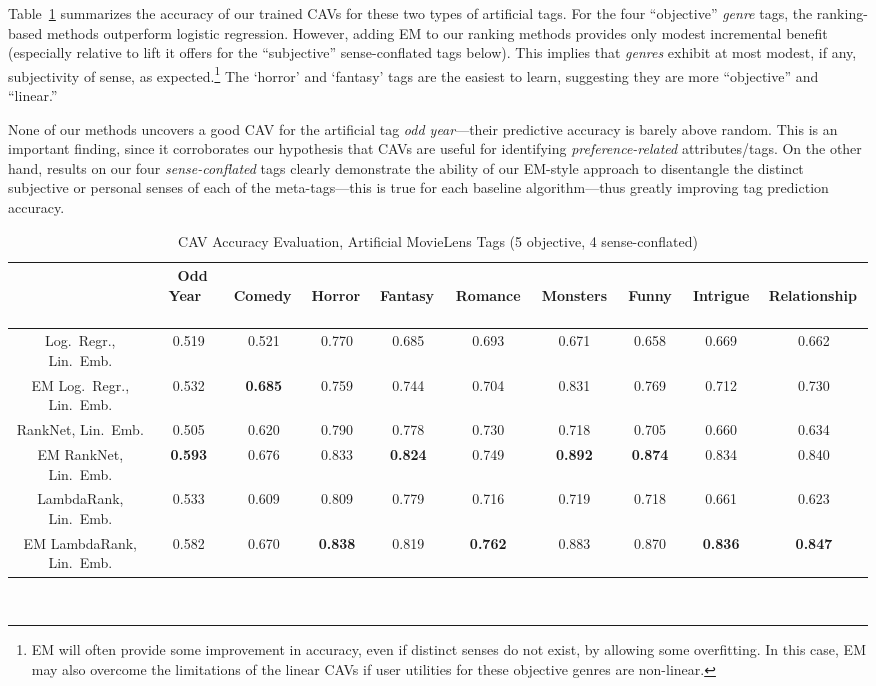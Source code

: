 \documentclass[manuscript,screen,nonacm]{acmart}
\newcommand{\1}{{\mathbf 1}}
\theoremstyle{TheoremNum}
\begin{document}
Table~\ref{tab:subjectivity_movielens} summarizes the accuracy of our trained CAVs for these two types of artificial tags. For the four ``objective'' \textit{genre} tags, the ranking-based methods outperform logistic regression. However, adding EM to our ranking methods provides only modest incremental benefit (especially relative to lift it offers for the ``subjective'' sense-conflated tags below). This implies that \textit{genres} exhibit at most modest, if any, subjectivity of sense, as expected.\footnote{EM will often provide some improvement in accuracy, even if distinct senses do not exist, by allowing some overfitting. In this case, EM may also overcome the limitations of the linear CAVs if user utilities for these objective genres are non-linear.} The `horror' and `fantasy' tags are the easiest to learn, suggesting they are more ``objective'' and ``linear.''

None of our methods uncovers a good CAV for the artificial tag \textit{odd year}---their predictive accuracy is barely above random. This is an important finding, since it corroborates our hypothesis that CAVs are useful for identifying \emph{preference-related} attributes/tags.
On the other hand, results on our four \emph{sense-conflated} tags clearly demonstrate the ability of our EM-style approach to disentangle the distinct subjective or personal senses of each of the meta-tags---this is true for each baseline algorithm---thus greatly improving tag prediction accuracy.


\begin{table}[t]
  \centering
  {\footnotesize
  \begin{tabular}{|@{\ }c||@{\ }c|@{\ }c|@{\ }c|@{\ }c|@{\ }c||@{\ }c|@{\ }c|@{\ }c|@{\ }c|} \hline
 & \, Odd Year \, & \, Comedy\, & \, Horror\, & \, Fantasy\, & \, Romance \, & \, Monsters \, & \, Funny  \, & \, Intrigue \, & \, Relationship\, \\ \hline\hline
Log.\ Regr., Lin.\ Emb. & 0.519 & 0.521 & 0.770 & 0.685 & 0.693 & 0.671 & 0.658 & 0.669 & 0.662 \\ \hline
EM Log.\ Regr., Lin.\ Emb. & 0.532 & \textbf{0.685} & 0.759 & 0.744 & 0.704 & 0.831 & 0.769 & 0.712 & 0.730 \\ \hline
RankNet, Lin.\ Emb. & 0.505 & 0.620 & 0.790 & 0.778 & 0.730 & 0.718 & 0.705 & 0.660 & 0.634 \\ \hline
EM RankNet, Lin.\ Emb. & \textbf{0.593} & 0.676 & 0.833 & \textbf{0.824} & 0.749 & \textbf{0.892} & \textbf{0.874} & 0.834 & 0.840 \\ \hline
LambdaRank, Lin.\ Emb. & 0.533 & 0.609 & 0.809 & 0.779 & 0.716 & 0.719 & 0.718 & 0.661 & 0.623 \\ \hline
EM LambdaRank, Lin.\ Emb. & 0.582 & 0.670 & \textbf{0.838} & 0.819 & \textbf{0.762} & 0.883 & 0.870 & \textbf{0.836} & \textbf{0.847} \\ \hline
 \end{tabular}
  }\\
\vspace*{2mm}
\caption{CAV Accuracy Evaluation, Artificial MovieLens Tags (5 objective, 4 sense-conflated)}
  \label{tab:subjectivity_movielens}
    \vspace{-0.2in}
\end{table}
\end{document}
